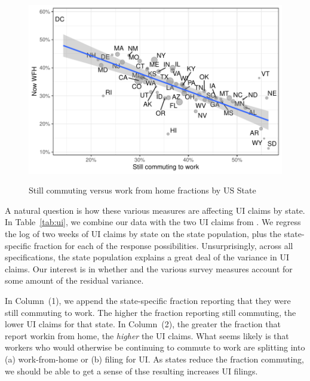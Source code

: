 \documentclass[12pt]{article}
\begin{document}
\begin{figure}
  \caption{Still commuting versus work from home fractions by US State} \label{fig:commute_vs_wfh}
\centering
\begin{minipage}{0.8 \linewidth}
  \includegraphics[width = \linewidth]{plots/commute_vs_wfh.pdf} \\
  \begin{footnotesize}
    \end{footnotesize}
\end{minipage}
\end{figure} 

A natural question is how these various measures are affecting UI claims by state. 
In Table~\ref{tab:ui}, we combine our data with the two UI claims from \cite{goldsmith2020}.
We regress the log of two weeks of UI claims by state on the state population, plus the state-specific fraction for each of the response possibilities.  
Unsurprisingly, across all specifications, the state population explains a great deal of the variance in UI claims.
Our interest is in whether and the various survey measures account for some amount of the residual variance.



In Column~(1), we append the state-specific fraction reporting that they were still commuting to work.
The higher the fraction reporting still commuting, the lower UI claims for that state.
In Column~(2), the greater the fraction that report workin from home, the \emph{higher} the UI claims.
What seems likely is that workers who would otherwise be continuing to commute to work are splitting into (a) work-from-home or (b) filing for UI.
As states reduce the fraction commuting, we should be able to get a sense of thse resulting increases UI filings. 
\end{document}
